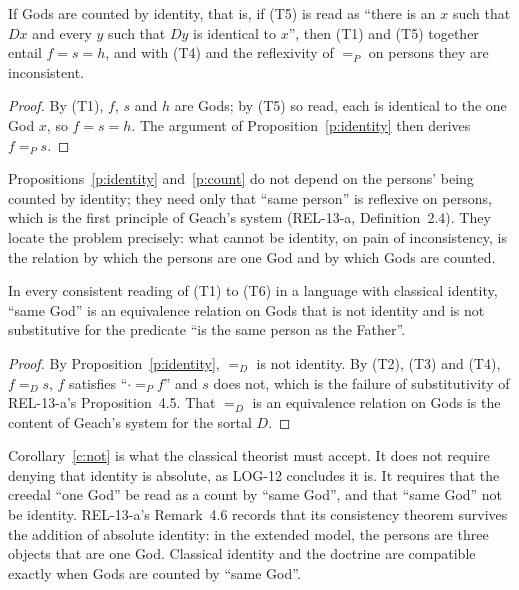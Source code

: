 \documentclass{situationist-preprint}
\begin{document}
\begin{proposition}\label{p:count}
If Gods are counted by identity, that is, if (T5) is read as \enquote{there is an $x$ such that $Dx$ and every $y$ such that $Dy$ is identical to $x$}, then (T1) and (T5) together entail $f = s = h$, and with (T4) and the reflexivity of $=_P$ on persons they are inconsistent.
\end{proposition}

\begin{proof}
By (T1), $f$, $s$ and $h$ are Gods; by (T5) so read, each is identical to the one God $x$, so $f = s = h$. The argument of Proposition~\ref{p:identity} then derives $f =_P s$.
\end{proof}

Propositions~\ref{p:identity} and~\ref{p:count} do not depend on the persons' being counted by identity; they need only that \enquote{same person} is reflexive on persons, which is the first principle of Geach's system (REL-13-a, Definition~2.4). They locate the problem precisely: what cannot be identity, on pain of inconsistency, is the relation by which the persons are one God and by which Gods are counted.

\begin{corollary}\label{c:not}
In every consistent reading of (T1) to (T6) in a language with classical identity, \enquote{same God} is an equivalence relation on Gods that is not identity and is not substitutive for the predicate \enquote{is the same person as the Father}.
\end{corollary}

\begin{proof}
By Proposition~\ref{p:identity}, $=_D$ is not identity. By (T2), (T3) and (T4), $f =_D s$, $f$ satisfies \enquote{$\cdot =_P f$} and $s$ does not, which is the failure of substitutivity of REL-13-a's Proposition~4.5. That $=_D$ is an equivalence relation on Gods is the content of Geach's system for the sortal $D$.
\end{proof}

Corollary~\ref{c:not} is what the classical theorist must accept. It does not require denying that identity is absolute, as LOG-12 concludes it is. It requires that the creedal \enquote{one God} be read as a count by \enquote{same God}, and that \enquote{same God} not be identity. REL-13-a's Remark~4.6 records that its consistency theorem survives the addition of absolute identity: in the extended model, the persons are three objects that are one God. Classical identity and the doctrine are compatible exactly when Gods are counted by \enquote{same God}.
\end{document}
